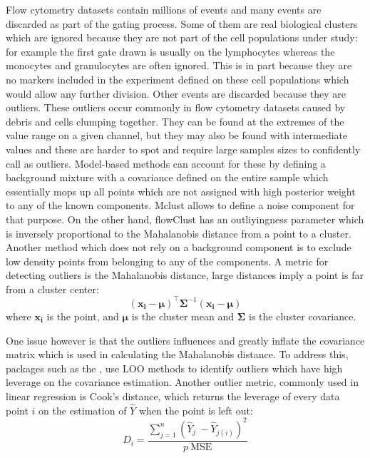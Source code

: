 Flow cytometry datasets contain millions of events and many events are discarded as part of the gating process.
Some of them are real biological clusters which are ignored because they are not part of the cell populations under study:
for example the first gate drawn is usually on the lymphocytes whereas the monocytes and granulocytes are often ignored.
This is in part because they are no markers included in the experiment defined on these cell populations which would allow any further division.
Other events are discarded because they are outliers. These outliers occur commonly in flow cytometry datasets caused by debris and cells clumping together.
They can be found at the extremes of the value range on a given channel, but they may also be found with intermediate values and these are harder to spot and require large samples sizes to confidently call as outliers.
Model-based methods can account for these by defining a background mixture with a covariance defined on the entire sample which essentially mops up all points
which are not assigned with high posterior weight to any of the known components.
Mclust allows to define a noise component for that purpose.
On the other hand, flowClust  has an outliyingness parameter which is inversely proportional to the Mahalanobis distance from a point to a cluster.
Another method which does not rely on a background component is to exclude low density points from belonging to any of the components.
A metric for detecting outliers is the Mahalanobis distance, large distances imply a point is far from a cluster center:
\[
(\boldsymbol{x_i}-\boldsymbol{\mu})^{\top}\boldsymbol{\Sigma}^{-1}(\boldsymbol{x_i}-\boldsymbol{\mu})
\]
where $\boldsymbol{x_i}$ is the point, and $\boldsymbol{\mu}$ is the cluster mean and $\boldsymbol{\Sigma}$ is the cluster covariance.

One issue however is that the outliers influences and greatly inflate the covariance matrix which is used in calculating the Mahalanobis distance.
To address this, packages such as the , use \gls{LOO} methods to identify outliers which have high leverage on the covariance estimation.
Another outlier metric, commonly used in linear regression is Cook's distance, which returns the leverage of every data point $i$  on the estimation of $\hat Y$ when the point is left out:
\[
D_i = \frac{ \sum_{j=1}^n (\hat Y_j\ - \hat Y_{j(i)})^2 }{p \ \mathrm{MSE}}
\]

